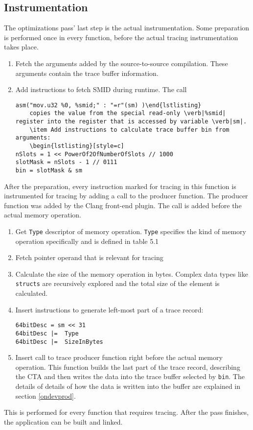 \subsection{Instrumentation}\label{instru}
The optimizations pass' last step is the actual instrumentation. Some preparation is performed once in every function, before the actual tracing instrumentation takes place.
\begin{enumerate}
	\item Fetch the arguments added by the source-to-source compilation. These arguments contain the trace buffer information.
	\item Add instructions to fetch SMID during runtime. The call 
		\begin{lstlisting}[style=c]
asm("mov.u32 %0, %smid;" : "=r"(sm) )\end{lstlisting}
	copies the value from the special read-only \verb|%smid| register into the register that is accessed by variable \verb|sm|.
	\item Add instructions to calculate trace buffer bin from arguments:
	\begin{lstlisting}[style=c]
nSlots = 1 << PowerOf2OfNumberOfSlots // 1000
slotMask = nSlots - 1 // 0111
bin = slotMask & sm\end{lstlisting}
\end{enumerate}
After the preparation, every instruction marked for tracing in this function is instrumented for tracing by adding a call to the producer function. The producer function was added by the Clang front-end plugin. The call is added before the actual memory operation.

\begin{enumerate}
	\item Get  \verb|Type| descriptor of memory operation. 	\verb|Type| specifies the kind of memory operation specifically and is defined in table 5.1%
	\item Fetch pointer operand that is relevant for tracing
	\item Calculate the size of the memory operation in bytes. Complex data types like \verb|structs| are recursively explored and the total size of the element is calculated.
	\item Insert instructions to generate left-most part of a trace record:
		\begin{lstlisting}[style=c]
64bitDesc = sm << 31
64bitDesc |=  Type
64bitDesc |=  SizeInBytes\end{lstlisting}

	\item Insert call to trace producer function right before the actual memory operation. This function builds the
	last part of the trace record, describing the CTA and then writes the data into the trace buffer selected by \verb|bin|. The details of details of how the data is written into the buffer are explained in section \ref{ondevprod}.
\end{enumerate}
This is performed for every function that requires tracing. After the pass finishes, the application can be built
and linked.


